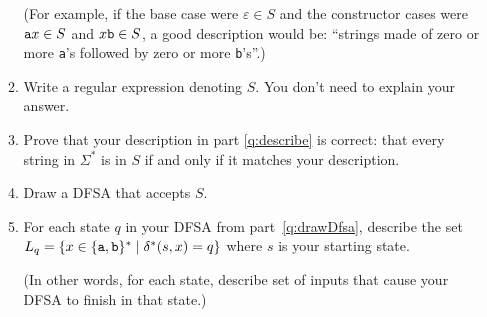 \documentclass{article}
\newcommand{\C}[1]{\textup{\texttt{#1}}}
\newcommand\emptyString{\varepsilon}
\begin{document}
\begin{enumerate}
\begin{enumerate}[label=(\alph*)]
(For example, if the base case were \( \emptyString \in S \) and the
constructor cases were \( \C{a} x \in S \) and \( x \C{b} \in S \), a good
description would be: ``strings made of zero or more \C{a}'s followed by zero
or more \C{b}'s''.)

\item Write a regular expression denoting \( S \). You don't need to explain
your answer.

\item Prove that your description in part \ref{q:describe} is correct:
that every string in \( \Sigma^* \) is in \( S \) if and only if it matches
your description.

\item \label{q:drawDfsa} Draw a DFSA that accepts \( S \).

\item \label{q:describeDfsaStates} For each state \( q \) in your DFSA from
part~\ref{q:drawDfsa}, describe the set
\( L_q = \{ x \in \{ \C{a}, \C{b} \}^* \mid \delta^*( s, x ) = q \} \) where
\( s \) is your starting state.

(In other words, for each state, describe set of inputs that cause your DFSA to
finish in that state.)
\end{enumerate}
\end{enumerate}
\end{document}

